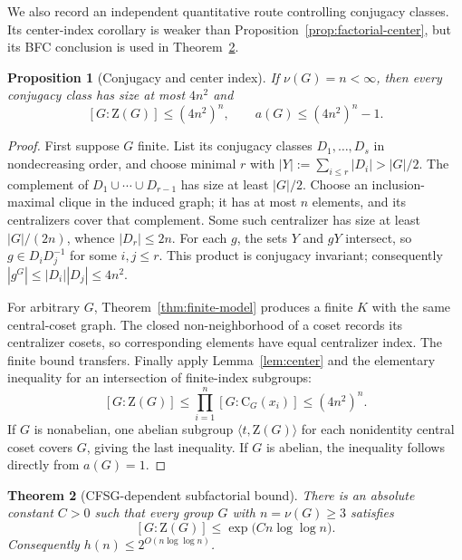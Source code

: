 \documentclass[11pt]{article}
\newtheorem{theorem}{Theorem}[section]
\newtheorem{proposition}[theorem]{Proposition}
\theoremstyle{remark}
\newcommand{\nuG}{\nu}
\newcommand{\aG}{a}
\newcommand{\Z}{\mathrm Z}
\newcommand{\CG}{\mathrm C}
\begin{document}
We also record an independent quantitative route controlling conjugacy
classes.  Its center-index corollary is weaker than
Proposition~\ref{prop:factorial-center}, but its BFC conclusion is used in
Theorem~\ref{thm:subfactorial}.

\begin{proposition}[Conjugacy and center index]\label{prop:conjugacy}
If $\nuG(G)=n<\infty$, then every conjugacy class has size at most $4n^2$ and
\[
 [G:\Z(G)]\le(4n^2)^n,\qquad \aG(G)\le(4n^2)^n-1.
\]
\end{proposition}

\begin{proof}
First suppose $G$ finite.  List its conjugacy classes $D_1,\dots,D_s$ in
nondecreasing order, and choose minimal $r$ with
$|Y|:=\sum_{i\le r}|D_i|>|G|/2$.  The complement of
$D_1\cup\cdots\cup D_{r-1}$ has size at least $|G|/2$. Choose an
inclusion-maximal clique in the induced graph; it has at most $n$ elements,
and its centralizers cover that complement. Some such
centralizer has size at least $|G|/(2n)$, whence $|D_r|\le2n$.
For each $g$, the sets $Y$ and $gY$ intersect, so $g\in D_iD_j^{-1}$ for
some $i,j\le r$.  This product is conjugacy invariant; consequently
$|g^G|\le|D_i||D_j|\le4n^2$.

For arbitrary $G$, Theorem~\ref{thm:finite-model} produces a finite $K$
with the same central-coset graph.  The closed non-neighborhood of a coset
records its centralizer cosets, so corresponding elements have equal
centralizer index.  The finite bound transfers.  Finally apply
Lemma~\ref{lem:center} and the elementary inequality for an intersection of
finite-index subgroups:
\[
 [G:\Z(G)]\le\prod_{i=1}^n[G:\CG_G(x_i)]\le(4n^2)^n.
\]
If $G$ is nonabelian, one abelian subgroup
$\langle t,\Z(G)\rangle$ for each nonidentity central coset covers $G$,
giving the last inequality. If $G$ is abelian, the inequality follows
directly from $\aG(G)=1$.
\end{proof}

\begin{theorem}[CFSG-dependent subfactorial bound]
\label{thm:subfactorial}
There is an absolute constant $C>0$ such that every group $G$ with
$n=\nuG(G)\ge3$ satisfies
\[
 [G:\Z(G)]\le \exp\!\bigl(Cn\log\log n\bigr).
\]
Consequently $h(n)\le2^{O(n\log\log n)}$.
\end{theorem}
\end{document}
